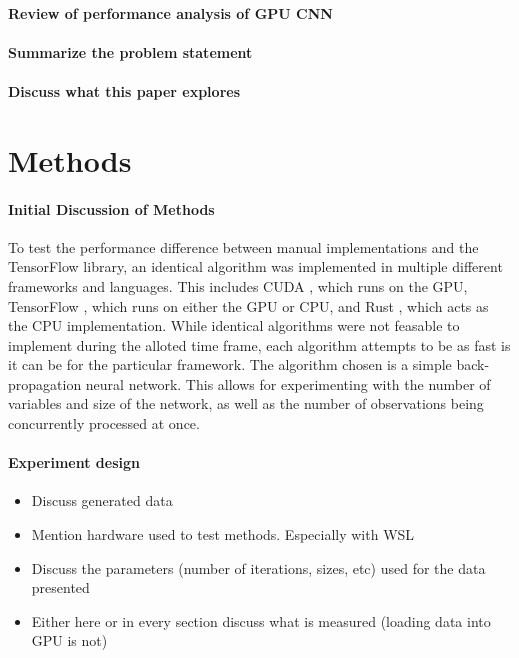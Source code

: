 \documentclass[12pt]{article}
\begin{document}
\paragraph{Review of performance analysis of GPU CNN}


\paragraph{Summarize the problem statement}

\paragraph{Discuss what this paper explores}

\section{Methods}

\paragraph{Initial Discussion of Methods}

To test the performance difference between manual implementations and the TensorFlow library, an identical algorithm was implemented in multiple different frameworks and languages.
This includes CUDA \cite{lib_cuda}, which runs on the GPU, TensorFlow \cite{lib_tensorflow}, which runs on either the GPU or CPU, and Rust \cite{lang_rust}, which acts as the CPU implementation.
While identical algorithms were not feasable to implement during the alloted time frame, each algorithm attempts to be as fast is it can be for the particular framework.
The algorithm chosen is a simple back-propagation neural network.
This allows for experimenting with the number of variables and size of the network, as well as the number of observations being concurrently processed at once.

\paragraph{Experiment design}

\begin{itemize}
	\item Discuss generated data
	\item Mention hardware used to test methods. Especially with WSL
	\item Discuss the parameters (number of iterations, sizes, etc) used for the data presented
	\item Either here or in every section discuss what is measured (loading data into GPU is not)
\end{itemize}
\end{document}
